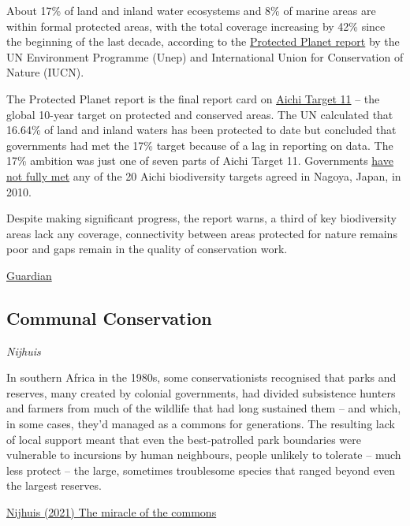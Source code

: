 \documentclass[
]{book}
\begin{document}
About 17\% of land and inland water ecosystems and 8\% of marine areas are within formal protected areas, with the total coverage increasing by 42\% since the beginning of the last decade, according to the \href{https://livereport.protectedplanet.net/}{Protected Planet report} by the UN Environment Programme (Unep) and International Union for Conservation of Nature (IUCN).

The Protected Planet report is the final report card on \href{http://url3193.iucn-crm.org/ls/click}{Aichi Target 11} -- the global 10-year target on protected and conserved areas. The UN calculated that 16.64\% of land and inland waters has been protected to date but concluded that governments had met the 17\% target because of a lag in reporting on data. The 17\% ambition was just one of seven parts of Aichi Target 11. Governments \href{https://www.theguardian.com/environment/2020/sep/15/every-global-target-to-stem-destruction-of-nature-by-2020-missed-un-report-aoe}{have not fully met} any of the 20 Aichi biodiversity targets agreed in Nagoya, Japan, in 2010.

Despite making significant progress, the report warns, a third of key biodiversity areas lack any coverage, connectivity between areas protected for nature remains poor and gaps remain in the quality of conservation work.

\href{https://www.theguardian.com/environment/2021/may/19/governments-achieve-10-year-target-of-protecting-17-percent-land-aoe}{Guardian}

\hypertarget{communal-conservation}{%
\subsection{Communal Conservation}\label{communal-conservation}}

\emph{Nijhuis}

In southern Africa in the 1980s, some conservationists recognised that parks and reserves, many created by colonial governments, had divided subsistence hunters and farmers from much of the wildlife that had long sustained them -- and which, in some cases, they'd managed as a commons for generations. The resulting lack of local support meant that even the best-patrolled park boundaries were vulnerable to incursions by human neighbours, people unlikely to tolerate -- much less protect -- the large, sometimes troublesome species that ranged beyond even the largest reserves.

\href{The\%20miracle\%20of\%20the\%20commons}{Nijhuis (2021) The miracle of the commons}
\end{document}
